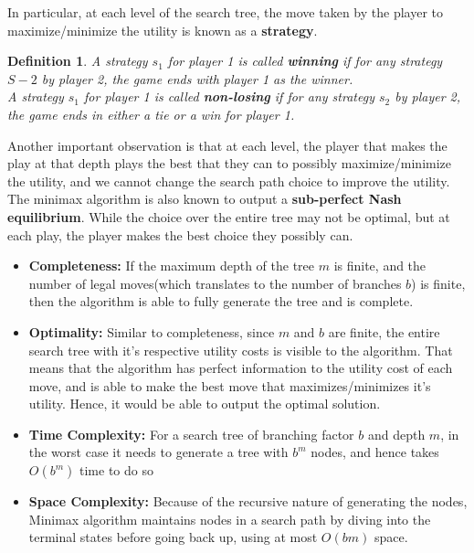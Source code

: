 \documentclass[12pt]{article}
\newtheorem{definition}{Definition}
\begin{document}
In particular, at each level of the search tree, the move taken by the player to maximize/minimize the utility is known as a \textbf{strategy}.  

\begin{definition}
A strategy $s_1$ for player 1 is called \textbf{winning} if for any strategy $S-2$ by player 2, the game ends with player 1 as the winner.\\
A strategy $s_1$ for player 1 is called \textbf{non-losing} if for any strategy $s_2$ by player 2, the game ends in either a tie or a win for player 1.
\end{definition}

Another important observation is that at each level, the player that makes the play at that depth plays the best that they can to possibly maximize/minimize the utility, and we cannot change the search path choice to improve the utility. The minimax algorithm is also known to output a \textbf{sub-perfect Nash equilibrium}. While the choice over the entire tree may not be optimal, but at each play, the player makes the best choice they possibly can.

\begin{itemize}
\item \textbf{Completeness:} If the maximum depth of the tree $m$ is finite, and the number of legal moves(which translates to the number of branches $b$) is finite, then the algorithm is able to fully generate the tree and is complete.

\item \textbf{Optimality:} Similar to completeness, since $m$ and $b$ are finite, the entire search tree with it's respective utility costs is visible to the algorithm. That means that the algorithm has perfect information to the utility cost of each move, and is able to make the best move that maximizes/minimizes it's utility. Hence, it would be able to output the optimal solution.

\item \textbf{Time Complexity:} For a search tree of branching factor $b$ and depth $m$, in the worst case it needs to generate a tree with $b^m$ nodes, and hence takes $O(b^m)$ time to do so

\item \textbf{Space Complexity:} Because of the recursive nature of generating the nodes, Minimax algorithm maintains nodes in a search path by diving into the terminal states before going back up, using at most $O(bm)$ space.
\end{itemize}
\end{document}
